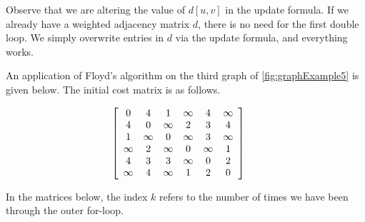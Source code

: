 \begin{note}
Observe that we are altering the value of $d[u, v]$ in the update
formula. If we already have a weighted adjacency matrix $d$, there is
no need for the first double loop. We simply overwrite entries in $d$
via the update formula, and everything works.
\end{note}

\begin{Example}
\label{eg:floyd}
An application of Floyd's algorithm on the third graph of
\cref{fig:graphExample5} is given below.  The initial cost 
matrix is as follows.

\[ 
\left[
\begin{array}{cccccc} %
0        & 4        & 1        & \infty & 4        & \infty \\
4        & 0        & \infty & 2        & 3        & 4 \\
1        &  \infty  & 0        &  \infty  & 3        &  \infty  \\
 \infty  & 2        &  \infty  & 0        &  \infty  & 1 \\
4        & 3        & 3        &  \infty  & 0        & 2 \\
 \infty  & 4        &  \infty  & 1        & 2        & 0 \\
\end{array}
\right]
\hspace{.5cm}
\]

In the matrices below, the index $k$ refers to
the number of times we have been through the outer for-loop.


\end{Example}
